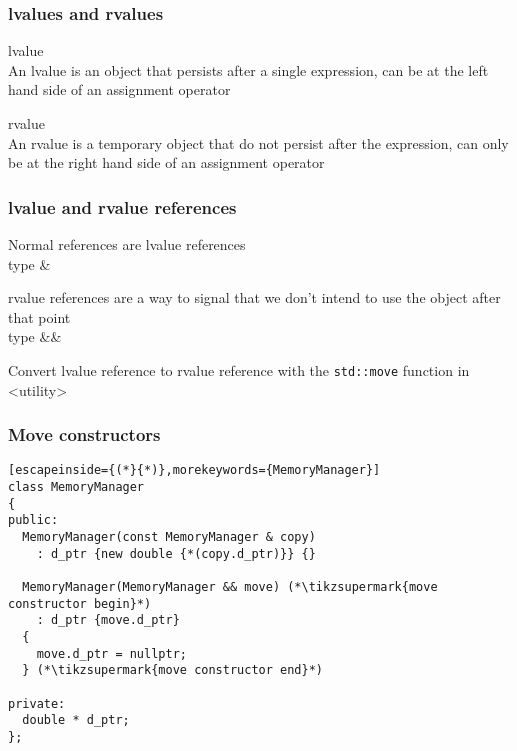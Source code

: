 \documentclass[14pt,a4paper,dvipsnames,usenames]{beamer}
\begin{document}
\begin{frame}
  \frametitle{lvalues and rvalues}

  {\large\color{Marty} lvalue}\\
  An lvalue is an object that persists after a single expression, can be at the left hand side of an assignment operator

  \vspace{1em}
  {\large\color{Marty} rvalue}\\
  An rvalue is a temporary object that do not persist after the expression, can only be at the right hand side of an assignment
  operator
  
\end{frame}

\begin{frame}[fragile]
  \frametitle{lvalue and rvalue references}

  Normal references are lvalue references\\[3pt]
  \hspace{1em} {\color{FeebleWeek}type} {\ttfamily \&}
  

  \vspace{1em}
  rvalue references are a way to signal that we don't intend to use the object after that point\\[3pt]
  \hspace{1em} {\color{FeebleWeek}type} {\ttfamily \&\&}

  \vspace{.5em}
  Convert lvalue reference to rvalue reference with the \lstinline!std::move! function in 
  {\ttfamily\color{sorange}<utility>}
  
  \CPPEleven
\end{frame}

\begin{frame}[fragile]
  \frametitle{Move constructors}


  \begin{lstlisting}[escapeinside={(*}{*)},morekeywords={MemoryManager}]
class MemoryManager
{
public:
  MemoryManager(const MemoryManager & copy)
    : d_ptr {new double {*(copy.d_ptr)}} {}

  MemoryManager(MemoryManager && move) (*\tikzsupermark{move constructor begin}*)
    : d_ptr {move.d_ptr}
  {
    move.d_ptr = nullptr;
  } (*\tikzsupermark{move constructor end}*)

private:
  double * d_ptr;
};
  \end{lstlisting}

  \CPPEleven
\end{frame}
\end{document}
